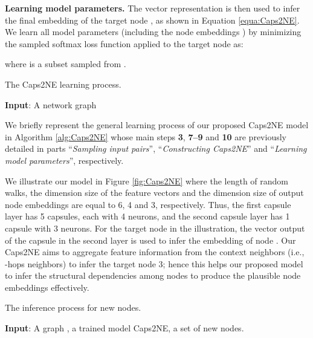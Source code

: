 \documentclass[sigconf]{acmart}
\begin{document}
 
\textbf{Learning model parameters.} The vector representation   is then used to infer the final embedding  of the target node , as shown in Equation \ref{equa:Caps2NE}.
We learn all model parameters (including the node embeddings ) by minimizing the sampled softmax loss function \citep{Jean2015} applied to the target node  as:

\noindent where  is a subset sampled from .

\begin{algorithm}
\caption{The Caps2NE learning process.}
\label{alg:Caps2NE}
{
\DontPrintSemicolon
\SetAlgoVlined
\textbf{Input}: A network graph 



}
\end{algorithm}


We briefly  represent the general learning process of our proposed Caps2NE model in Algorithm \ref{alg:Caps2NE} whose main steps \textbf{3}, \textbf{7--9} and \textbf{10} are previously detailed in parts ``\textit{Sampling input pairs}'', ``\textit{Constructing Caps2NE}'' and ``\textit{Learning model parameters}'', respectively. 

We illustrate our model in Figure \ref{fig:Caps2NE} where the length  of random walks, the dimension size  of the feature vectors and the  dimension size  of output node embeddings are equal to 6, 4 and 3, respectively. 
Thus, the first capsule layer has 5 capsules, each with 4 neurons, and the second capsule layer has 1 capsule with 3 neurons. 
For the target node  in the illustration, the vector output of the capsule in the second layer is used to infer the embedding of node .
Our Caps2NE aims to aggregate feature information from the context neighbors (i.e., -hops neighbors) to infer the target node 3; hence this helps our proposed model to infer the structural dependencies among nodes to produce the plausible node embeddings effectively.


\begin{algorithm}
\caption{The inference process for new nodes.}
\label{alg:InferInd}
{
\DontPrintSemicolon
\SetAlgoVlined
\textbf{Input}: A graph , a trained model Caps2NE, a set  of new nodes.

}
\end{algorithm}
\end{document}
